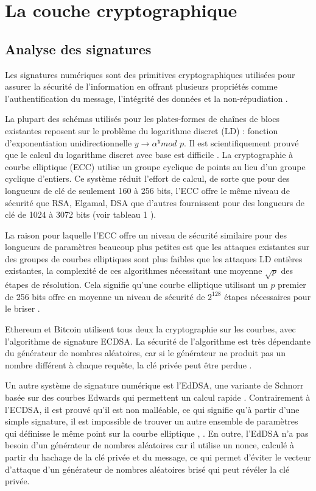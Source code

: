 \documentclass[journal]{IEEEtran}
\begin{document}
\section{La couche cryptographique}
\subsection{Analyse des signatures}
Les signatures numériques sont des primitives cryptographiques utilisées pour assurer la sécurité de l'information en offrant plusieurs propriétés comme l'authentification du message, l'intégrité des données et la non-répudiation  \cite{24}.

La plupart des schémas utilisés pour les plates-formes de chaînes  de blocs existantes reposent sur le problème du logarithme discret (LD) : fonction d’exponentiation unidirectionnelle $y \to \alpha^y mod$ $p$. Il est scientifiquement prouvé que le calcul du logarithme discret avec base est difficile \cite{25}. La cryptographie à courbe elliptique (ECC) utilise un groupe cyclique de points au lieu d'un groupe cyclique d'entiers. Ce système réduit l'effort de calcul, de sorte que pour des longueurs de clé de seulement 160 à 256 bits, l'ECC offre le même niveau de sécurité que RSA, Elgamal, DSA que d'autres fournissent pour des longueurs de clé de 1024 à 3072 bits (voir tableau 1  \cite{24}).

La raison pour laquelle l'ECC offre un niveau de sécurité similaire pour des longueurs de paramètres beaucoup plus petites est que les attaques existantes sur des groupes de courbes elliptiques sont plus faibles que les attaques LD entières existantes, la complexité de ces algorithmes nécessitant une moyenne $\sqrt{p}$ des étapes de résolution. Cela signifie qu'une courbe elliptique utilisant un $p$ premier de 256 bits offre en moyenne un niveau de sécurité de $2^{128}$ étapes nécessaires pour le briser  \cite{24}.

Ethereum et Bitcoin utilisent tous deux la cryptographie sur  les courbes, avec l'algorithme de signature ECDSA. La sécurité de l'algorithme est très dépendante du générateur de nombres aléatoires, car si le générateur ne produit pas un nombre différent à chaque requête, la clé privée peut être perdue  \cite{26}.

Un autre système de signature numérique est l'EdDSA, une variante de Schnorr basée sur des courbes Edwards qui permettent un calcul rapide  \cite{27}. Contrairement à l'ECDSA, il est prouvé qu'il est non malléable, ce qui signifie qu'à partir d'une simple signature, il est impossible de trouver un autre ensemble de paramètres qui définisse le même point sur la courbe elliptique  \cite{28},  \cite{29}. En outre, l'EdDSA n'a pas besoin d'un générateur de nombres aléatoires car il utilise un nonce, calculé à partir du hachage de la clé privée et du message, ce qui permet d'éviter le vecteur d'attaque d'un générateur de nombres aléatoires brisé qui peut révéler la clé privée.
\end{document}
